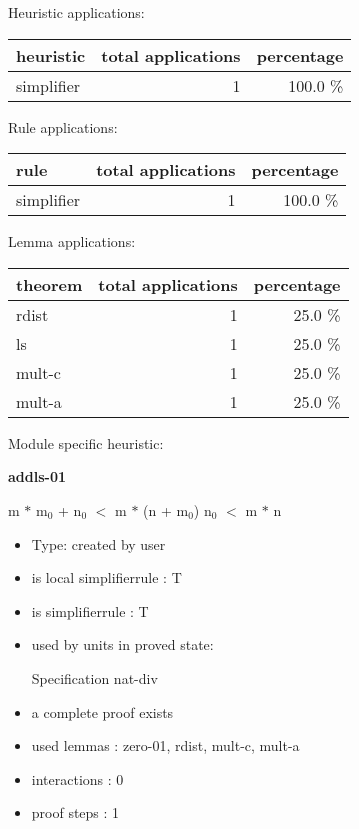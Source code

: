 \documentclass[a4paper]{article}
\begin{document}
\medskip


Heuristic applications:

\begin{supertabular}{l|r|r}
heuristic	& total applications & percentage \\ \hline
simplifier & 1 & 100.0 \% \\

\end{supertabular}

Rule applications:

\begin{supertabular}{l|r|r}
rule	        & total applications & percentage \\ \hline
simplifier & 1 & 100.0 \% \\

\end{supertabular}

Lemma applications:

\begin{supertabular}{l|r|r}
theorem	        & total applications & percentage \\ \hline
rdist & 1 & 25.0 \% \\
ls & 1 & 25.0 \% \\
mult-c & 1 & 25.0 \% \\
mult-a & 1 & 25.0 \% \\

\end{supertabular}

Module specific heuristic:

\pagebreak

{\LARGE\bf addls-01}\label{lemma-addls-01}

\medskip

 \Fol m $*$ $\mbox{m}_{0}$ + $\mbox{n}_{0}$ $<$ m $*$ (n + $\mbox{m}_{0}$) \Equiv $\mbox{n}_{0}$ $<$ m $*$ n

\begin{itemize}

\item Type: created by user

\item is local simplifierrule : T
\item is simplifierrule : T
\item used by units in proved state:

Specification nat-div
\item       a complete proof exists
\item       used lemmas  : zero-01, rdist, mult-c, mult-a
\item       interactions : 0
\item       proof steps  : 1
\end{itemize}
\end{document}
